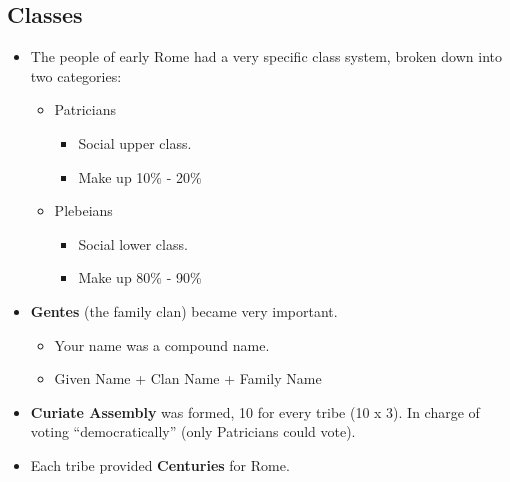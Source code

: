 \documentclass[12pt, twoside]{article}
\begin{document}
\subsection{Classes}
\begin{itemize}
\item The people of early Rome had a very specific class system, broken down into two categories:
	\begin{itemize}
	\item Patricians
		\begin{itemize}
		\item Social upper class.
		\item Make up 10\% - 20\%
		\end{itemize}
	\item Plebeians
		\begin{itemize}
		\item Social lower class.
		\item Make up 80\% - 90\%
		\end{itemize}
	\end{itemize}
\item \textbf{Gentes} (the family clan) became very important.
	\begin{itemize}
	\item Your name was a compound name.
	\item Given Name + Clan Name + Family Name
	\end{itemize}
\item \textbf{Curiate Assembly} was formed, 10 for every tribe (10 x 3).  In charge of voting ``democratically'' (only Patricians could vote).
\item Each tribe provided \textbf{Centuries} for Rome.


\end{itemize}
\end{document}
